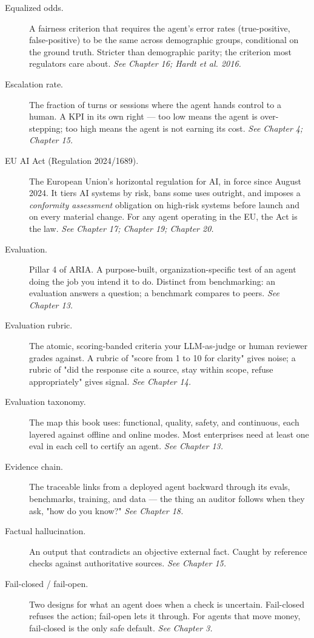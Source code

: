 \begin{description}
  \item[Equalized odds.] A fairness criterion that requires the agent's error rates (true-positive, false-positive) to be the same across demographic groups, conditional on the ground truth. Stricter than demographic parity; the criterion most regulators care about. \textit{See Chapter 16; Hardt et al. 2016.}
  \item[Escalation rate.] The fraction of turns or sessions where the agent hands control to a human. A KPI in its own right — too low means the agent is over-stepping; too high means the agent is not earning its cost. \textit{See Chapter 4; Chapter 15.}
  \item[EU AI Act (Regulation 2024/1689).] The European Union's horizontal regulation for AI, in force since August 2024. It tiers AI systems by risk, bans some uses outright, and imposes a \textit{conformity assessment} obligation on high-risk systems before launch and on every material change. For any agent operating in the EU, the Act is the law. \textit{See Chapter 17; Chapter 19; Chapter 20.}
  \item[Evaluation.] Pillar 4 of ARIA. A purpose-built, organization-specific test of an agent doing the job you intend it to do. Distinct from benchmarking: an evaluation answers a question; a benchmark compares to peers. \textit{See Chapter 13.}
  \item[Evaluation rubric.] The atomic, scoring-banded criteria your LLM-as-judge or human reviewer grades against. A rubric of "score from 1 to 10 for clarity" gives noise; a rubric of "did the response cite a source, stay within scope, refuse appropriately" gives signal. \textit{See Chapter 14.}
  \item[Evaluation taxonomy.] The map this book uses: functional, quality, safety, and continuous, each layered against offline and online modes. Most enterprises need at least one eval in each cell to certify an agent. \textit{See Chapter 13.}
  \item[Evidence chain.] The traceable links from a deployed agent backward through its evals, benchmarks, training, and data — the thing an auditor follows when they ask, "how do you know?" \textit{See Chapter 18.}
  \item[Factual hallucination.] An output that contradicts an objective external fact. Caught by reference checks against authoritative sources. \textit{See Chapter 15.}
  \item[Fail-closed / fail-open.] Two designs for what an agent does when a check is uncertain. Fail-closed refuses the action; fail-open lets it through. For agents that move money, fail-closed is the only safe default. \textit{See Chapter 3.}

\end{description}
